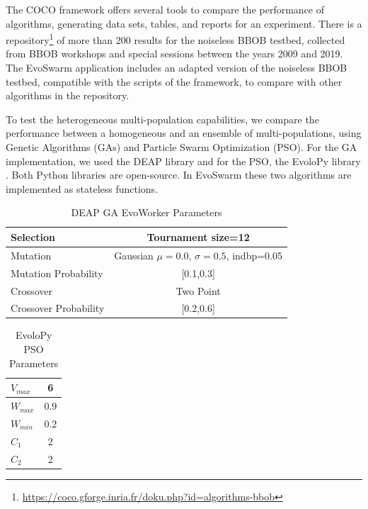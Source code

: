 \documentclass[review]{elsarticle}
\begin{document}
The COCO framework offers several tools to compare the performance of
algorithms, generating data sets, tables, and reports for an experiment. There
is a repository\footnote{\url{https://coco.gforge.inria.fr/doku.php?id=algorithms-bbob}} 
of more than 200 results for the noiseless BBOB testbed, collected from 
BBOB workshops and special sessions between the years 2009 and 2019. The
EvoSwarm application includes an adapted version of the noiseless BBOB testbed,
compatible with the scripts of the framework, to compare with other algorithms
in the repository.

To test the heterogeneous multi-population capabilities,  we compare the
performance between a homogeneous and an ensemble of multi-populations, using
Genetic Algorithms (GAs) and Particle Swarm Optimization (PSO). For the GA
implementation, we used the DEAP library \cite{fortin2012deap} and for the PSO,
the EvoloPy library \cite{faris2016evolopy}. Both Python libraries are
open-source. In EvoSwarm these two algorithms are implemented as stateless
functions.

\begin{table}[h!tbp]
  \small
  \caption{DEAP GA EvoWorker Parameters }
  \label{tab:GAparams} 
  \centering
  \small
  \begin{tabular}{|l|c|}
    \hline
    Selection & Tournament size=12                            \\ \hline
    Mutation & Gaussian $\mu=0.0$, $\sigma=0.5$, indbp=0.05   \\ \hline
    Mutation Probability & [0.1,0.3]                          \\ \hline
    Crossover & Two Point                                     \\ \hline
    Crossover Probability  & [0.2,0.6]                          \\ \hline
  \end{tabular}
\end{table}
%
\begin{table}[h!tbp]
  \small
  \caption{ EvoloPy PSO Parameters }
  \label{tab:PSOparams} 
  \centering
  \small
  \begin{tabular}{|l|c|}
    \hline
    $V_{max}$ & 6 \\ \hline
    $W_{max}$ & $0.9$ \\ \hline
    $W_{min}$ & $0.2$ \\ \hline
    $C_1$ & 2 \\ \hline
    $C_2$ & 2 \\ \hline
  \end{tabular}
\end{table}
\end{document}

